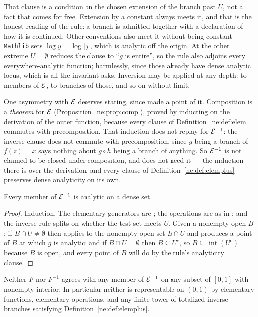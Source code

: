 That clause is a condition on the chosen extension of the branch past $U$, not
a fact that comes for free.  Extension by a constant always meets it, and that
is the honest reading of the rule: a branch is admitted together with a
declaration of how it is continued.  Other conventions also meet it without
being constant --- \texttt{Mathlib} sets $\log y=\log|y|$, which is analytic
off the origin.  At the other extreme $U=\emptyset$ reduces the clause to
``$g$ is entire'', so the rule also adjoins every everywhere-analytic
function; harmlessly, since those already have dense analytic locus, which is
all the invariant asks.  Inversion may be applied at any depth: to members of
$\mathcal E$, to branches of those, and so on without limit.

One asymmetry with $\mathcal E$ deserves stating, since  made a
point of it.  Composition is a \emph{theorem} for $\mathcal E$
(Proposition~\ref{ne:prop:comp}), proved by inducting on the derivation of the
outer function, because every clause of Definition~\ref{ne:def:elem} commutes with
precomposition.  That induction does not replay for $\mathcal E^{-1}$: the inverse
clause does not commute with precomposition, since $g$ being a branch of
$f(z)=x$ says nothing about $g\circ h$ being a branch of anything.  So
$\mathcal E^{-1}$ is not claimed to be closed under composition, and
 does not need it --- the induction there is over the
derivation, and every clause of Definition~\ref{ne:def:elemplus} preserves dense
analyticity on its own.

\begin{theorem}\label{ne:thm:plusdense}
Every member of $\mathcal E^{-1}$ is analytic on a dense set.
\end{theorem}

\begin{proof}
Induction.  The elementary generators are ; the operations
are as in ; and the inverse rule splits on whether the test
set meets $U$.  Given a nonempty open $B$: if $B\cap U\ne\emptyset$ then
 applies to the nonempty open set $B\cap U$ and produces a
point of $B$ at which $g$ is analytic; and if $B\cap U=\emptyset$ then
$B\subseteq U^{\mathsf c}$, so
$B\subseteq\operatorname{int}(U^{\mathsf c})$ because $B$ is open, and every
point of $B$ will do by the rule's analyticity clause.
\end{proof}

\begin{corollary}\label{ne:cor:plusmain}
Neither $F$ nor $F^{-1}$ agrees with any member of $\mathcal E^{-1}$ on any subset
of $[0,1]$ with nonempty interior.  In particular neither is representable on
$(0,1)$ by elementary functions, elementary operations, and any finite tower
of totalized inverse branches satisfying Definition~\ref{ne:def:elemplus}.
\end{corollary}

